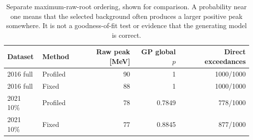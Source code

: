 \begin{table}[H]\centering\small
\begin{tabular}{llrrr}\toprule
Dataset & Method & Raw peak [MeV] & GP global $p$ & Direct exceedances\\\midrule
2016 full & Profiled & 90 & 1 & 1000/1000 \\
2016 full & Fixed & 88 & 1 & 1000/1000 \\
2021 10\% & Profiled & 78 & 0.7849 & 778/1000 \\
2021 10\% & Fixed & 77 & 0.8845 & 877/1000 \\
\bottomrule\end{tabular}
\caption{Separate maximum-raw-root ordering, shown for comparison. A probability near one means that the selected background often produces a larger positive peak somewhere. It is not a goodness-of-fit test or evidence that the generating model is correct.}\end{table}

